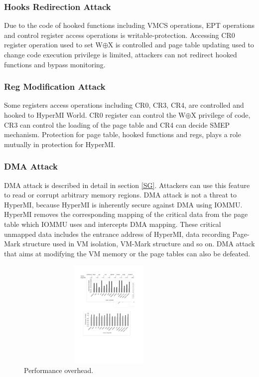 \documentclass[conference]{IEEEtran}
\begin{document}
\subsubsection{Hooks Redirection Attack}

Due to the code of hooked functions including VMCS operations, EPT operations and control register access operations is writable-protection. Accessing CR0 register operation used to set W$\oplus${X} is controlled and page table updating used to change code execution privilege is limited, attackers can not redirect hooked functions and bypass monitoring.

\subsubsection{Reg Modification Attack}

Some registers access operations including CR0, CR3, CR4, are controlled and hooked to HyperMI World. CR0 register can control the W$\oplus${X} privilege of code, CR3 can control the loading of the page table and CR4 can decide SMEP mechanism. Protection for page table, hooked functions and regs, plays a role mutually in protection for HyperMI. 

\subsubsection{DMA Attack}

 DMA attack is described in detail in section \ref{SG}. Attackers can use this feature to read or corrupt arbitrary memory regions. DMA attack is not a threat to HyperMI, because HyperMI is inherently secure against DMA using IOMMU. HyperMI removes the corresponding mapping of the critical data from the page table which IOMMU uses and intercepts DMA mapping. These critical unmapped data includes the entrance address of HyperMI, data recording Page-Mark structure used in VM isolation, VM-Mark structure and so on. DMA attack that aims at modifying the VM memory or the page tables can also be defeated.

\begin{figure}
\centerline{\includegraphics[width=9cm,height=5.2cm]{performance.pdf}}
\caption{Performance overhead.} \label{fig5}
\end{figure}
\end{document}
